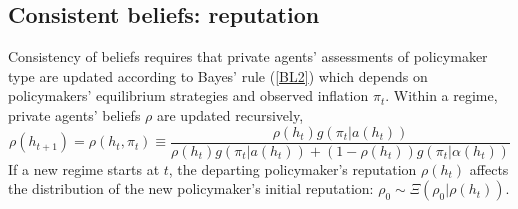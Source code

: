 \documentclass[12pt,letter,leqno]{article}
\theoremstyle{asn}
\theoremstyle{lem}
\theoremstyle{slem}
\theoremstyle{prop}
\theoremstyle{appprop}
\theoremstyle{rem}
\theoremstyle{defn}
\begin{document}
\subsection{Consistent beliefs: reputation}

Consistency of beliefs requires that private agents' assessments of policymaker type are updated 
according to Bayes' rule (\ref{BL2}) which depends on policymakers' equilibrium strategies and observed inflation $\pi_t$. Within a regime, private agents' beliefs $\rho $ are updated recursively,%
\begin{equation}
\rho \left( h_{t+1}\right) =\rho \left( h_{t},\pi _{t}\right) \equiv \frac{\rho
\left( h_{t}\right) g(\pi _{t}|a\left( h_{t}\right) )}{\rho \left(
h_{t}\right) g(\pi _{t}|a\left( h_{t}\right) )+(1-\rho \left( h_{t}\right)
)g(\pi _{t}|\alpha \left( h_{t}\right) )}  \label{BL2}
\end{equation}%
If a new regime starts at $t$, the departing policymaker's reputation $\rho(h_t)$ affects the distribution of the new policymaker's initial reputation: $\rho_0 \sim \Xi(\rho_0|\rho(h_{t}))$. 
\end{document}
